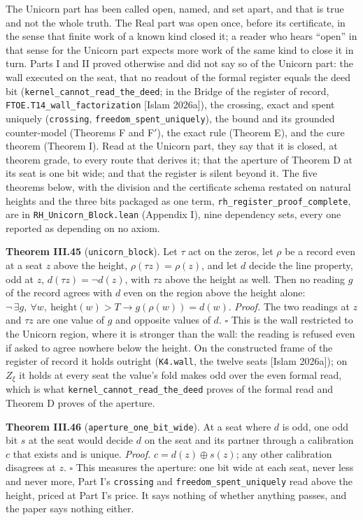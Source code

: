 \documentclass[10pt,twocolumn]{article}
\begin{document}
The Unicorn part has been called open, named, and set apart, and that is
true and not the whole truth. The Real part was open once, before its
certificate, in the sense that finite work of a known kind closed it; a
reader who hears ``open'' in that sense for the Unicorn part expects
more work of the same kind to close it in turn. Parts I and II proved
otherwise and did not say so of the Unicorn part: the wall executed on
the seat, that no readout of the formal register equals the deed bit
(\texttt{kernel\_cannot\_read\_the\_deed}; in the Bridge of the register
of record, \texttt{FTOE.T14\_wall\_factorization} {[}Islam 2026a{]}),
the crossing, exact and spent uniquely (\texttt{crossing},
\texttt{freedom\_spent\_uniquely}), the bound and its grounded
counter-model (Theorems F and F\('\)), the exact rule (Theorem E), and
the cure theorem (Theorem I). Read at the Unicorn part, they say that it
is closed, at theorem grade, to every route that derives it; that the
aperture of Theorem D at its seat is one bit wide; and that the register
is silent beyond it. The five theorems below, with the division and the
certificate schema restated on natural heights and the three bits
packaged as one term, \texttt{rh\_register\_proof\_complete}, are in
\texttt{RH\_Unicorn\_Block.lean} (Appendix I), nine dependency sets,
every one reported as depending on no axiom.

\textbf{Theorem III.45} (\texttt{unicorn\_block}). Let \(\tau\) act on
the zeros, let \(\rho\) be a record even at a seat \(z\) above the
height, \(\rho(\tau z) = \rho(z)\), and let \(d\) decide the line
property, odd at \(z\), \(d(\tau z) = \neg d(z)\), with \(\tau z\) above
the height as well. Then no reading \(g\) of the record agrees with
\(d\) even on the region above the height alone:
\(\neg\,\exists g,\ \forall w,\ \mathrm{height}(w) > T \to g(\rho(w)) = d(w)\).
\emph{Proof.} The two readings at \(z\) and \(\tau z\) are one value of
\(g\) and opposite values of \(d\). \(\square\) This is the wall
restricted to the Unicorn region, where it is stronger than the wall:
the reading is refused even if asked to agree nowhere below the height.
On the constructed frame of the register of record it holds outright
(\texttt{K4.wall}, the twelve seats {[}Islam 2026a{]}); on \(Z_\xi\) it
holds at every seat the value's fold makes odd over the even formal
read, which is what \texttt{kernel\_cannot\_read\_the\_deed} proves of
the formal read and Theorem D proves of the aperture.

\textbf{Theorem III.46} (\texttt{aperture\_one\_bit\_wide}). At a seat
where \(d\) is odd, one odd bit \(s\) at the seat would decide \(d\) on
the seat and its partner through a calibration \(c\) that exists and is
unique. \emph{Proof.} \(c = d(z) \oplus s(z)\); any other calibration
disagrees at \(z\). \(\square\) This measures the aperture: one bit wide
at each seat, never less and never more, Part I's \texttt{crossing} and
\texttt{freedom\_spent\_uniquely} read above the height, priced at Part
I's price. It says nothing of whether anything passes, and the paper
says nothing either.
\end{document}
